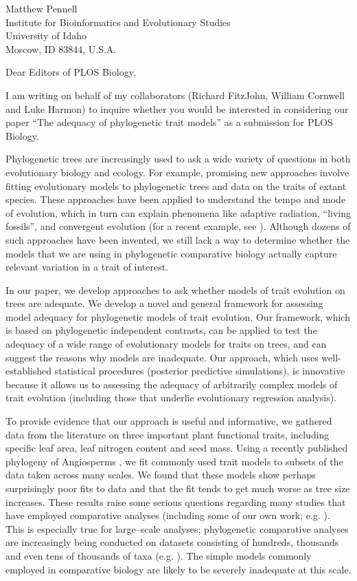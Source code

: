 \documentclass[a4paper,12pt]{article}
\begin{document}
{\raggedright
  Matthew Pennell\\
  Institute for Bioinformatics and Evolutionary Studies\\
  University of Idaho\\
 Moscow, ID 83844, U.S.A.\\[2ex]
}

\vspace{3ex}

Dear Editors of PLOS Biology,

I am writing on behalf of my collaborators (Richard FitzJohn, William Cornwell and Luke Harmon) to inquire whether you would be interested in considering our paper ``The adequacy of phylogenetic trait models'' as a submission for PLOS Biology. 

Phylogenetic trees are increasingly used to ask a wide variety of questions in both evolutionary biology and ecology. For example, promising new approaches involve fitting evolutionary models to phylogenetic trees and data on the traits of extant species. These approaches have been applied to understand the tempo and mode of evolution, which in turn can explain phenomena like adaptive radiation, ``living fossils'', and convergent evolution (for a recent example, see \citep{Mahler2013}). Although dozens of such approaches have been invented, we still lack a way to determine whether the models that we are using in phylogenetic comparative biology actually capture relevant variation in a trait of interest. 

In our paper, we develop approaches to ask whether models of trait evolution on trees are adequate. We develop a novel and general framework for assessing model adequacy for phylogenetic models of trait evolution.  Our framework, which is based on phylogenetic independent contrasts, can be applied to test the adequacy of a wide range of evolutionary models for traits on trees, and can suggest the reasons why models are inadequate. Our approach, which uses well-established statistical procedures (posterior predictive simulations), is innovative because it allows us to assessing the adequacy of arbitrarily complex models of trait evolution (including those that underlie evolutionary regression analysis).

To provide evidence that our approach is useful and informative, we gathered data from the literature on three important plant functional traits, including specific leaf area, leaf nitrogen content and seed mass. Using a recently published phylogeny of Angiosperms \citep{Zanne2013}, we fit commonly used trait models to subsets of the data taken across many scales. We found that these models show perhaps surprisingly poor fits to data and that the fit tends to get much worse as tree size increases. These results raise some serious questions regarding many studies that have employed comparative analyses (including some of our own work; e.g. \citep{Harmon2010}). This is especially true for large--scale analyses; phylogenetic comparative analyses are increasingly being conducted on datasets consisting of hundreds, thousands and even tens of thousands of taxa (e.g. \citep{Venditti2011, Rabosky2013}). The simple models commonly employed in comparative biology are likely to be severely inadequate at this scale. 
\end{document}
